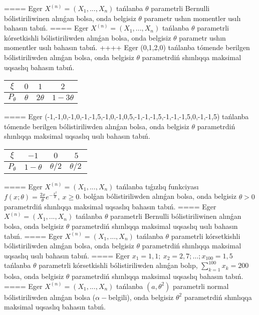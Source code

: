 ====
Eger \(X^{(n)} = \left( X_{1},...,X_{n} \right)\) tańlanba \(\theta\) parametrli Bernulli bólistiriliwinen alınǵan bolsa, onda belgisiz \(\theta\) parametr ushın momentler usılı bahasın tabıń.
====
Eger \(X^{(n)} = \left( X_{1},...,X_{n} \right)\) tańlanba \(\theta\) parametrli kórsetkishli bólistiriliwden alınǵan bolsa, onda belgisiz \(\theta\) parametr ushın momentler usılı bahasın tabıń.
++++
Eger (0,1,2,0) tańlanba tómende berilgen bólistiriliwden alınǵan bolsa, onda belgisiz \(\theta\) parametrdiń shınlıqqa maksimal uqsaslıq bahasın tabıń.
\begin{tabular}{|c|c|c|c|}
  \hline
$\xi$
&
$0$
&
$1$
&
$2$\\
\hline
\(P_{\theta}\) & \(\theta\) & \(2\theta\) & \(1 - 3\theta\) \\
\hline
\end{tabular}
====
Eger (-1,-1,0,-1,0,-1,-1,5,-1,0,-1,0,5,-1,-1,-1,5,-1,-1,-1,5,0,-1,-1,5) tańlanba tómende berilgen bólistiriliwden alınǵan bolsa, onda belgisiz \(\theta\) parametrdiń shınlıqqa maksimal uqsaslıq usılı bahasın tabıń.
\begin{tabular}{|c|c|c|c|}
  \hline
$\xi$
&
$- 1$
&
$0$
&
$5$\\
\hline
\(P_{\theta}\) & \(1 - \theta\) & \(\theta/2\) & \(\theta/2\ \) \\
\hline
\end{tabular}
====
Eger \(X^{(n)} = \left( X_{1},...,X_{n} \right)\) tańlanba tıǵızlıq funkciyası \(f(x;\theta) = \frac{2x}{\theta}e^{- \frac{x^{2}}{\theta}},\ x \geq 0\). bolǵan bólistiriliwden alınǵan bolsa, onda belgisiz \(\theta > 0\) parametrdiń shınlıqqa maksimal uqsaslıq bahasın tabıń.
====
Eger \(X^{(n)} = \left( X_{1},...,X_{n} \right)\) tańlanba \(\theta\) parametrli Bernulli bólistiriliwinen alınǵan bolsa, onda belgisiz \(\theta\) parametrdiń shınlıqqa maksimal uqsaslıq usılı bahasın tabıń.
====
Eger \(X^{(n)} = \left( X_{1},...,X_{n} \right)\) tańlanba \(\theta\) parametrli kórsetkishli bólistiriliwden alınǵan bolsa, onda belgisiz \(\theta\) parametrdiń shınlıqqa maksimal uqsaslıq usılı bahasın tabıń.
====
Eger \(x_{1} = 1,1;\ x_{2} = 2,7;\ldots;x_{100} = 1,5\) tańlanba \(\theta\) parametrli kórsetkishli bólistiriliwden alınǵan bolıp, \(\sum_{k = 1}^{100}x_{k} = 200\) bolsa, onda belgisiz \(\theta\) parametrdiń shınlıqqa maksimal uqsaslıq bahasın tabıń.
====
Eger \(X^{(n)} = \left( X_{1},...,X_{n} \right)\) tańlanba \(\left( a,\theta^{2} \right)\) parametrli normal bólistiriliwden alınǵan bolsa (\(\alpha -\)belgili), onda belgisiz \(\theta^{2}\) parametrdiń shınlıqqa maksimal uqsaslıq bahasın tabıń.
